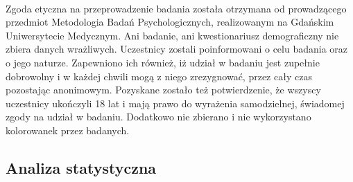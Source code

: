 \documentclass[12pt,a4paper,final,oneside,onecolumn,titlepage]{article}
\begin{document}
\paragraph{}
Zgoda etyczna na przeprowadzenie badania została otrzymana od prowadzącego przedmiot Metodologia Badań Psychologicznych, realizowanym na Gdańskim Uniwersytecie Medycznym. Ani badanie, ani kwestionariusz demograficzny nie zbiera danych wrażliwych. Uczestnicy zostali poinformowani o celu badania oraz o jego naturze. Zapewniono ich również, iż udział w badaniu jest zupełnie dobrowolny i w każdej chwili mogą z niego zrezygnować, przez cały czas pozostając anonimowym. Pozyskane zostało też potwierdzenie, że wszyscy uczestnicy ukończyli 18 lat i mają prawo do wyrażenia samodzielnej, świadomej zgody na udział w badaniu. Dodatkowo nie zbierano i nie wykorzystano kolorowanek przez badanych.
\subsection*{\normalsize{\textbf{Analiza statystyczna}}}
\end{document}
